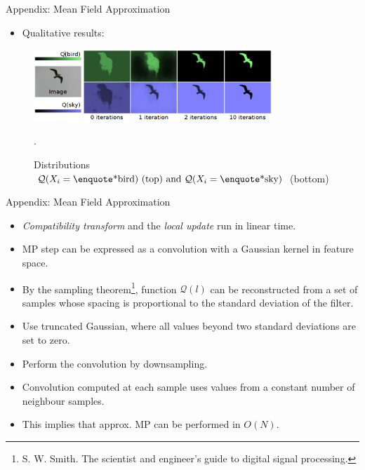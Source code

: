 \documentclass{beamer}
\begin{document}
\begin{frame}{Appendix: Mean Field Approximation}
\begin{itemize}
	\item Qualitative results:
\end{itemize}
\begin{figure}
	\centering
	\includegraphics[width=0.80\textwidth]{figure/ss50.png}
	\captionsetup{justification=centering}
	\caption{Distributions $\mathcal{Q}(X_i=\text{\enquote*{bird}) (top)} \text{ and } \mathcal{Q}(X_i=\text{\enquote*{sky})}$ (bottom)}.
	\label{fig:M11}
\end{figure}

\end{frame}

\begin{frame}{Appendix: Mean Field Approximation}
\begin{itemize}
	\item \textit{Compatibility transform} and the \textit{local update} run in linear time.
	\item MP step can be expressed as a convolution with a Gaussian kernel in feature space.
	\item By the sampling theorem\footnote{S. W. Smith. The scientist and engineer’s guide to digital signal processing.}, function ${\mathcal{Q}(l)}$ can be reconstructed from a set of samples whose spacing is proportional to the standard deviation of the filter.
	\item Use truncated Gaussian, where all values beyond two standard deviations are set to zero.
	\item Perform the convolution by downsampling.
	\item Convolution computed at each sample uses values from a constant number of neighbour samples.
	\item This implies that approx. MP can be performed in $O(N)$.
\end{itemize}
\end{frame}
\end{document}
